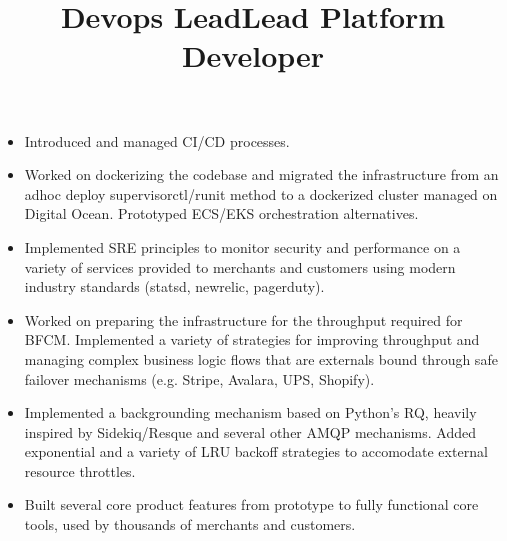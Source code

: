\begin{resume}
\title{Devops Lead}
\begin{position}
\begin{itemize}
\item Introduced and managed CI/CD processes.
\item Worked on dockerizing the codebase and migrated the infrastructure from an adhoc deploy supervisorctl/runit method to a dockerized cluster managed on Digital Ocean. Prototyped ECS/EKS orchestration alternatives.
\item Implemented SRE principles to monitor security and performance on a variety of services provided to merchants and customers using modern industry standards (statsd, newrelic, pagerduty).
\item Worked on preparing the infrastructure for the throughput required for BFCM. Implemented a variety of strategies for improving throughput and managing complex business logic flows that are externals bound through safe failover mechanisms (e.g. Stripe, Avalara, UPS, Shopify).
\item Implemented a backgrounding mechanism based on Python's RQ, heavily inspired by Sidekiq/Resque and several other AMQP mechanisms. Added exponential and a variety of LRU backoff strategies to accomodate external resource throttles.
\item Built several core product features from prototype to fully functional core tools, used by thousands of merchants and customers.
\end{itemize}
\end{position}

\title{Lead Platform Developer}
\begin{position}
\end{position}


\end{resume}
